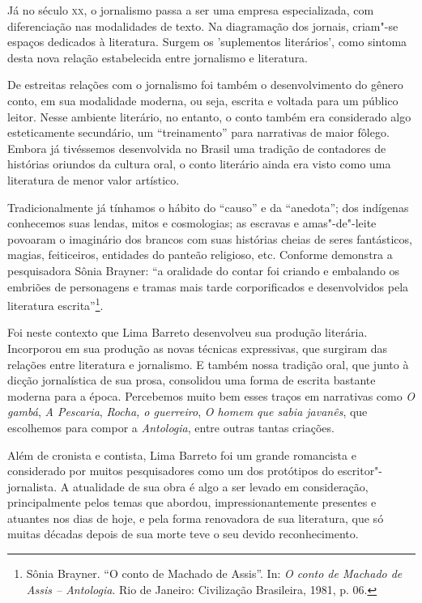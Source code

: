 \documentclass{extarticle}
\begin{document}
Já no século \textsc{xx}, o jornalismo passa a ser uma empresa especializada, com
diferenciação nas modalidades de texto. Na diagramação dos jornais,
criam"-se espaços dedicados à literatura. Surgem os 'suplementos
literários', como sintoma desta nova relação estabelecida entre
jornalismo e literatura.

De estreitas relações com o jornalismo foi também o desenvolvimento do
gênero conto, em sua modalidade moderna, ou seja, escrita e voltada para
um público leitor. Nesse ambiente literário, no entanto, o conto também
era considerado algo esteticamente secundário, um ``treinamento'' para
narrativas de maior fôlego. Embora já tivéssemos desenvolvida no Brasil
uma tradição de contadores de histórias oriundos da cultura oral, o
conto literário ainda era visto como uma literatura de menor valor
artístico.

Tradicionalmente já tínhamos o hábito do ``causo'' e da ``anedota''; dos
indígenas conhecemos suas lendas, mitos e cosmologias; as escravas e
amas"-de"-leite povoaram o imaginário dos brancos com suas histórias
cheias de seres fantásticos, magias, feiticeiros, entidades do panteão
religioso, etc. Conforme demonstra a pesquisadora Sônia Brayner: ``a
oralidade do contar foi criando e embalando os embriões de personagens e
tramas mais tarde corporificados e desenvolvidos pela literatura
escrita''\footnote{Sônia Brayner. ``O conto de Machado de Assis''. In:
  \emph{O conto de Machado de Assis -- Antologia}. Rio de Janeiro:
  Civilização Brasileira, 1981, p. 06.}.

Foi neste contexto que Lima Barreto desenvolveu sua produção literária.
Incorporou em sua produção as novas técnicas expressivas, que surgiram
das relações entre literatura e jornalismo. E também nossa tradição
oral, que junto à dicção jornalística de sua prosa, consolidou uma forma
de escrita bastante moderna para a época. Percebemos muito bem esses
traços em narrativas como {\textit{O gambá}}, {\textit{A
Pescaria}}, {\textit{Rocha, o guerreiro}}, {\textit{O homem
que sabia javanês}}, que escolhemos para compor a \emph{Antologia},
entre outras tantas criações.

Além de cronista e contista, Lima Barreto foi um grande romancista e
considerado por muitos pesquisadores como um dos protótipos do
escritor"-jornalista. A atualidade de sua obra é algo a ser levado em
consideração, principalmente pelos temas que abordou,
impressionantemente presentes e atuantes nos dias de hoje, e pela forma
renovadora de sua literatura, que só muitas décadas depois de sua morte
teve o seu devido reconhecimento.
\end{document}
